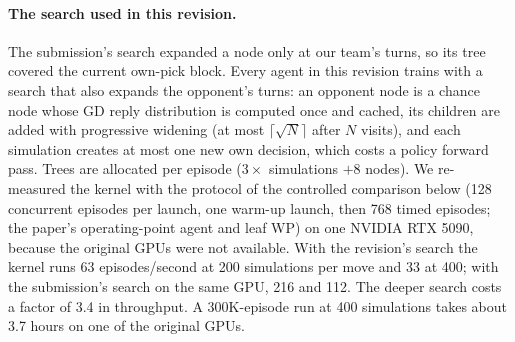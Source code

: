 \documentclass[journal]{IEEEtran}
\begin{document}
\paragraph{The search used in this revision.} The submission's search expanded a node only at our team's turns, so its tree covered the current own-pick block. Every agent in this revision trains with a search that also expands the opponent's turns: an opponent node is a chance node whose GD reply distribution is computed once and cached, its children are added with progressive widening (at most $\lceil\sqrt{N}\rceil$ after $N$ visits), and each simulation creates at most one new own decision, which costs a policy forward pass. Trees are allocated per episode ($3 \times$ simulations $+ 8$ nodes). We re-measured the kernel with the protocol of the controlled comparison below (128 concurrent episodes per launch, one warm-up launch, then 768 timed episodes; the paper's operating-point agent and leaf WP) on one NVIDIA RTX 5090, because the original GPUs were not available. With the revision's search the kernel runs 63 episodes/second at 200 simulations per move and 33 at 400; with the submission's search on the same GPU, 216 and 112. The deeper search costs a factor of 3.4 in throughput. A 300K-episode run at 400 simulations takes about 3.7 hours on one of the original GPUs.
\end{document}
